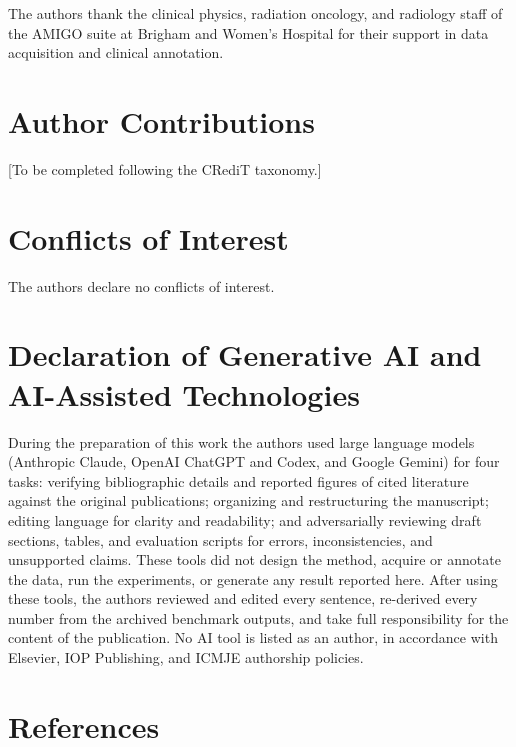 \documentclass[
  11pt,
]{article}
\begin{document}
The authors thank the clinical physics, radiation oncology, and
radiology staff of the AMIGO suite at Brigham and Women's Hospital for
their support in data acquisition and clinical annotation.

\section*{Author Contributions}\label{author-contributions}

{[}To be completed following the CRediT taxonomy.{]}

\section*{Conflicts of Interest}\label{conflicts-of-interest}

The authors declare no conflicts of interest.

\section*{Declaration of Generative AI and AI-Assisted
Technologies}\label{declaration-of-generative-ai-and-ai-assisted-technologies}

During the preparation of this work the authors used large language
models (Anthropic Claude, OpenAI ChatGPT and Codex, and Google Gemini)
for four tasks: verifying bibliographic details and reported figures of
cited literature against the original publications; organizing and
restructuring the manuscript; editing language for clarity and
readability; and adversarially reviewing draft sections, tables, and
evaluation scripts for errors, inconsistencies, and unsupported claims.
These tools did not design the method, acquire or annotate the data, run
the experiments, or generate any result reported here. After using these
tools, the authors reviewed and edited every sentence, re-derived every
number from the archived benchmark outputs, and take full responsibility
for the content of the publication. No AI tool is listed as an author,
in accordance with Elsevier, IOP Publishing, and ICMJE authorship
policies.

\section*{References}\label{references}
\end{document}
